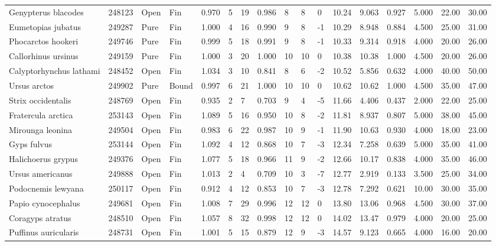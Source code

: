 \documentclass[10pt,a4paper]{amsart}
\theoremstyle{definition}
\theoremstyle{remark}
\numberwithin{equation}{section}
\begin{document}
\begin{table}[ht]
{\begin{tabular}{lllllllllllllllll}
Genypterus blacodes & 248123 & Open & Fin & 0.970 & 5 & 19 & 0.986 & 8 & 8 & 0 & 10.24 & 9.063 & 0.927 & 5.000 & 22.00 & 30.00 \\
Eumetopias jubatus & 249287 & Pure & Fin & 1.000 & 4 & 16 & 0.990 & 9 & 8 & -1 & 10.29 & 8.948 & 0.884 & 4.500 & 25.00 & 31.00 \\
Phocarctos hookeri & 249746 & Pure & Fin & 0.999 & 5 & 18 & 0.991 & 9 & 8 & -1 & 10.33 & 9.314 & 0.918 & 4.000 & 20.00 & 26.00 \\
Callorhinus ursinus & 249159 & Pure & Fin & 1.000 & 3 & 20 & 1.000 & 10 & 10 & 0 & 10.38 & 10.38 & 1.000 & 4.500 & 20.00 & 26.00 \\
Calyptorhynchus lathami & 248452 & Open & Fin & 1.034 & 3 & 10 & 0.841 & 8 & 6 & -2 & 10.52 & 5.856 & 0.632 & 4.000 & 40.00 & 50.00 \\
Ursus arctos & 249902 & Pure & Bound & 0.997 & 6 & 21 & 1.000 & 10 & 10 & 0 & 10.62 & 10.62 & 1.000 & 4.500 & 35.00 & 47.00 \\
Strix occidentalis & 248769 & Open & Fin & 0.935 & 2 & 7 & 0.703 & 9 & 4 & -5 & 11.66 & 4.406 & 0.437 & 2.000 & 22.00 & 25.00 \\
Fratercula arctica & 253143 & Open & Fin & 1.089 & 5 & 16 & 0.950 & 10 & 8 & -2 & 11.81 & 8.937 & 0.807 & 5.000 & 38.00 & 45.00 \\
Mirounga leonina & 249504 & Open & Fin & 0.983 & 6 & 22 & 0.987 & 10 & 9 & -1 & 11.90 & 10.63 & 0.930 & 4.000 & 18.00 & 23.00 \\
Gyps fulvus & 253144 & Open & Fin & 1.092 & 4 & 12 & 0.868 & 10 & 7 & -3 & 12.34 & 7.258 & 0.639 & 5.000 & 35.00 & 41.00 \\
Halichoerus grypus & 249376 & Open & Fin & 1.077 & 5 & 18 & 0.966 & 11 & 9 & -2 & 12.66 & 10.17 & 0.838 & 4.000 & 35.00 & 46.00 \\
Ursus americanus & 249888 & Open & Fin & 1.013 & 2 & 4 & 0.709 & 10 & 3 & -7 & 12.77 & 2.919 & 0.133 & 3.500 & 25.00 & 34.00 \\
Podocnemis lewyana & 250117 & Open & Fin & 0.912 & 4 & 12 & 0.853 & 10 & 7 & -3 & 12.78 & 7.292 & 0.621 & 10.00 & 30.00 & 35.00 \\
Papio cynocephalus & 249681 & Open & Fin & 1.008 & 7 & 29 & 0.996 & 12 & 12 & 0 & 13.80 & 13.06 & 0.968 & 4.500 & 30.00 & 37.00 \\
Coragyps atratus & 248510 & Open & Fin & 1.057 & 8 & 32 & 0.998 & 12 & 12 & 0 & 14.02 & 13.47 & 0.979 & 4.000 & 20.00 & 25.00 \\
Puffinus auricularis & 248731 & Open & Fin & 1.001 & 5 & 15 & 0.879 & 12 & 9 & -3 & 14.57 & 9.123 & 0.665 & 4.000 & 16.00 & 20.00 \\

\end{tabular}}
\end{table}
\end{document}
